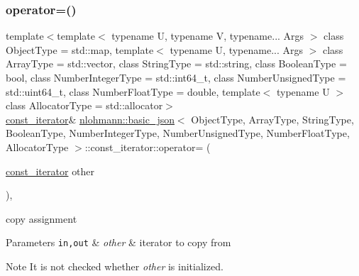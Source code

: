 \subsubsection{\texorpdfstring{operator=()}{operator=()}}
{\footnotesize\ttfamily template$<$template$<$ typename U, typename V, typename... Args $>$ class Object\+Type = std\+::map, template$<$ typename U, typename... Args $>$ class Array\+Type = std\+::vector, class String\+Type  = std\+::string, class Boolean\+Type  = bool, class Number\+Integer\+Type  = std\+::int64\+\_\+t, class Number\+Unsigned\+Type  = std\+::uint64\+\_\+t, class Number\+Float\+Type  = double, template$<$ typename U $>$ class Allocator\+Type = std\+::allocator$>$ \\
\hyperlink{classnlohmann_1_1basic__json_1_1const__iterator}{const\+\_\+iterator}\& \hyperlink{classnlohmann_1_1basic__json}{nlohmann\+::basic\+\_\+json}$<$ Object\+Type, Array\+Type, String\+Type, Boolean\+Type, Number\+Integer\+Type, Number\+Unsigned\+Type, Number\+Float\+Type, Allocator\+Type $>$\+::const\+\_\+iterator\+::operator= (\begin{DoxyParamCaption}\item[{\hyperlink{classnlohmann_1_1basic__json_1_1const__iterator}{const\+\_\+iterator}}]{other }\end{DoxyParamCaption})\hspace{0.3cm}{\ttfamily [inline]}, {\ttfamily [noexcept]}}



copy assignment 


\begin{DoxyParams}[1]{Parameters}
\mbox{\tt in,out}  & {\em other} & iterator to copy from \\
\hline
\end{DoxyParams}
\begin{DoxyNote}{Note}
It is not checked whether {\itshape other} is initialized. 
\end{DoxyNote}
\mbox{\label{classnlohmann_1_1basic__json_1_1const__iterator_acf1fcb73ff770117446670cefc927dd2}} 
